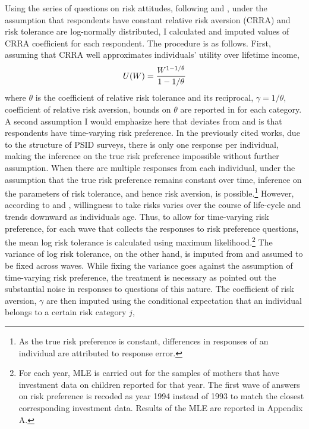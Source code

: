 \documentclass[]{article}
\begin{document}
Using the series of questions on risk attitudes, following \citet{kimball2008imputing} and \citet{kimball2009risk}, under the assumption that respondents have constant relative risk aversion (CRRA) and risk tolerance are log-normally distributed, I calculated and imputed values of CRRA coefficient for each respondent. The procedure is as follows. First, assuming that CRRA well approximates individuals' utility over lifetime income,
\[U(W)={W^{1-{1/\theta}}\over 1-{1/\theta}}\]
where $\theta$ is the coefficient of relative risk tolerance and its reciprocal, $\gamma = 1/\theta$, coefficient of relative risk aversion, bounds on $\theta$ are reported in  for each category. A second assumption I would emphasize here that deviates from \citet{kimball2008imputing} and \cite{kimball2009risk} is that respondents have time-varying risk preference. In the previously cited works, due to the structure of PSID surveys, there is only one response per individual, making the inference on the true risk preference impossible without further assumption. When there are multiple responses from each individual, under the assumption that the true risk preference remains constant over time, inference on the parameters of risk tolerance, and hence risk aversion, is possible.\footnote{As the true risk preference is constant, differences in responses of an individual are attributed to response error.} However, according to \citet{dohmen2011individual} and \citet{dohmen2017risk}, willingness to take risks varies over the course of life-cycle and trends downward as individuals age. Thus, to allow for time-varying risk preference, for each wave that collects the responses to risk preference questions, the mean log risk tolerance is calculated using maximum likelihood.\footnote{For each year, MLE is carried out for the samples of mothers that have investment data on children reported for that year. The first wave of answers on risk preference is recoded as year 1994 instead of 1993 to match the closest corresponding investment data. Results of the MLE are reported in Appendix A.} The variance of log risk tolerance, on the other hand, is imputed from \cite{kimball2009risk} and assumed to be fixed across waves. While fixing the variance goes against the assumption of time-varying risk preference, the treatment is necessary as \citet{kimball2008imputing} pointed out the substantial noise in responses to questions of this nature. The coefficient of risk aversion, $\gamma$ are then imputed using the conditional expectation that an individual belongs to a certain risk category $j$,
\end{document}
